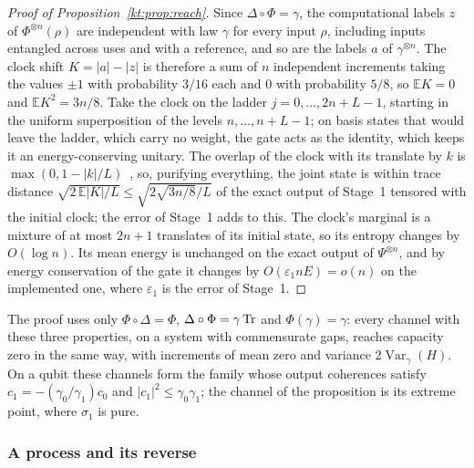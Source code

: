 \begin{proof}[Proof of Proposition~\ref{kt:prop:reach}]
Since $\Delta\circ\Phi=\gamma$, the computational labels $z$ of $\Phi^{\otimes n}(\rho)$ are independent with law $\gamma$ for every input $\rho$, including inputs entangled across uses and with a reference, and so are the labels $a$ of $\gamma^{\otimes n}$. The clock shift $K=|a|-|z|$ is therefore a sum of $n$ independent increments taking the values $\pm1$ with probability $3/16$ each and $0$ with probability $5/8$, so $\mathbb EK=0$ and $\mathbb EK^2=3n/8$. Take the clock on the ladder $j=0,\dots,2n+L-1$, starting in the uniform superposition of the levels $n,\dots,n+L-1$; on basis states that would leave the ladder, which carry no weight, the gate acts as the identity, which keeps it an energy-conserving unitary. The overlap of the clock with its translate by $k$ is $\max(0,1-|k|/L)$~\cite{Aberg14}, so, purifying everything, the joint state is within trace distance $\sqrt{2\,\mathbb E|K|/L}\le\sqrt{2\sqrt{3n/8}/L}$ of the exact output of Stage~1 tensored with the initial clock; the error of Stage~1 adds to this. The clock's marginal is a mixture of at most $2n+1$ translates of its initial state, so its entropy changes by $O(\log n)$. Its mean energy is unchanged on the exact output of $\Psi^{\otimes n}$, and by energy conservation of the gate it changes by $O(\varepsilon_1 nE)=o(n)$ on the implemented one, where $\varepsilon_1$ is the error of Stage~1.
\end{proof}

The proof uses only $\Phi\circ\Delta=\Phi$, $\Delta\circ\Phi=\gamma\operatorname{Tr}$ and $\Phi(\gamma)=\gamma$: every channel with these three properties, on a system with commensurate gaps, reaches capacity zero in the same way, with increments of mean zero and variance $2\operatorname{Var}_\gamma(H)$. On a qubit these channels form the family whose output coherences satisfy $c_1=-(\gamma_0/\gamma_1)c_0$ and $|c_1|^2\le\gamma_0\gamma_1$; the channel of the proposition is its extreme point, where $\sigma_1$ is pure.

\subsubsection{A process and its reverse}\label{kt:pf:arrow}

